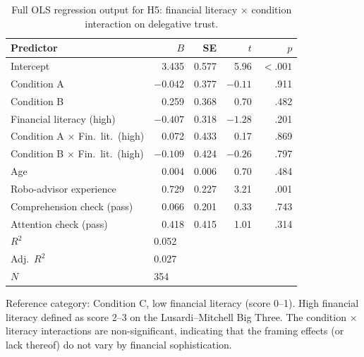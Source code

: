 \begin{table}[H]
\centering
\begin{threeparttable}
\caption{Full OLS regression output for H5: financial literacy $\times$ condition interaction on delegative trust.}
\label{tab:supp_reg_h5}
\begin{small}
\begin{tabular}{lr@{\hskip 6pt}r@{\hskip 6pt}r@{\hskip 6pt}r}
\toprule
Predictor & $B$ & SE & $t$ & $p$ \\
\midrule
Intercept                               &  3.435 & 0.577 &  5.96 & $< .001$\rlap{***} \\
Condition A                             & $-0.042$ & 0.377 & $-0.11$ & .911 \\
Condition B                             &  0.259 & 0.368 &  0.70 & .482 \\
Financial literacy (high)               & $-0.407$ & 0.318 & $-1.28$ & .201 \\
Condition A $\times$ Fin.\ lit.\ (high) &  0.072 & 0.433 &  0.17 & .869 \\
Condition B $\times$ Fin.\ lit.\ (high) & $-0.109$ & 0.424 & $-0.26$ & .797 \\
Age                                     &  0.004 & 0.006 &  0.70 & .484 \\
Robo-advisor experience                 &  0.729 & 0.227 &  3.21 & .001\rlap{**} \\
Comprehension check (pass)              &  0.066 & 0.201 &  0.33 & .743 \\
Attention check (pass)                  &  0.418 & 0.415 &  1.01 & .314 \\
\midrule
$R^2$ & \multicolumn{4}{l}{0.052} \\
Adj.\ $R^2$ & \multicolumn{4}{l}{0.027} \\
$N$ & \multicolumn{4}{l}{354} \\
\bottomrule
\end{tabular}
\end{small}
\begin{tablenotes}
\small
\item Reference category: Condition C, low financial literacy (score 0--1). High financial literacy defined as score 2--3 on the Lusardi--Mitchell Big Three. The condition $\times$ literacy interactions are non-significant, indicating that the framing effects (or lack thereof) do not vary by financial sophistication.
\end{tablenotes}
\end{threeparttable}
\end{table}

